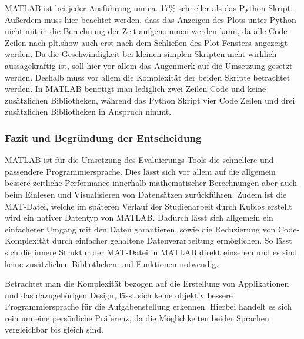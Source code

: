 MATLAB ist bei jeder Ausführung um ca. 17\% schneller als das Python Skript. Außerdem muss hier beachtet werden, dass das Anzeigen des Plots unter Python nicht mit in die Berechnung der Zeit aufgenommen werden kann, da alle Code-Zeilen nach \glqq plt.show\grqq{} auch erst nach dem Schließen des Plot-Fensters angezeigt werden. Da die Geschwindigkeit bei kleinen simplen Skripten nicht wirklich aussagekräftig ist, soll hier vor allem das Augenmerk auf die Umsetzung gesetzt werden. Deshalb muss vor allem die Komplexität der beiden Skripte betrachtet werden. In MATLAB benötigt man lediglich zwei Zeilen Code und keine zusätzlichen Bibliotheken, während das Python Skript vier Code Zeilen und drei zusätzlichen Bibliotheken in Anspruch nimmt.

\subsubsection{Fazit und Begründung der Entscheidung}

MATLAB ist für die Umsetzung des Evaluierungs-Tools die schnellere und passendere Programmiersprache. Dies lässt sich vor allem auf die allgemein bessere zeitliche Performance innerhalb mathematischer Berechnungen aber auch beim Einlesen und Visualisieren von Datensätzen zurückführen. Zudem ist die MAT-Datei, welche im späteren Verlauf der Studienarbeit durch Kubios erstellt wird ein nativer Datentyp von MATLAB. Dadurch lässt sich allgemein ein einfacherer Umgang mit den Daten garantieren, sowie die Reduzierung von Code-Komplexität durch einfacher gehaltene Datenverarbeitung ermöglichen. So lässt sich die innere Struktur der MAT-Datei in MATLAB direkt einsehen und es sind keine zusätzlichen Bibliotheken und Funktionen notwendig.

Betrachtet man die Komplexität bezogen auf die Erstellung von Applikationen und das dazugehörigen Design, lässt sich keine objektiv bessere Programmiersprache für die Aufgabenstellung erkennen. Hierbei handelt es sich rein um eine persönliche Präferenz, da die Möglichkeiten beider Sprachen vergleichbar bis gleich sind.
